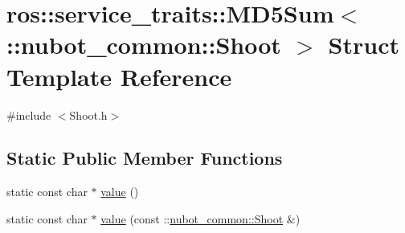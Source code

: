 \hypertarget{structros_1_1service__traits_1_1MD5Sum_3_01_1_1nubot__common_1_1Shoot_01_4}{\section{ros\-:\-:service\-\_\-traits\-:\-:M\-D5\-Sum$<$ \-:\-:nubot\-\_\-common\-:\-:Shoot $>$ Struct Template Reference}
\label{structros_1_1service__traits_1_1MD5Sum_3_01_1_1nubot__common_1_1Shoot_01_4}
}


{\ttfamily \#include $<$Shoot.\-h$>$}

\subsection*{Static Public Member Functions}
\begin{DoxyCompactItemize}
\item 
static const char $\ast$ \hyperlink{structros_1_1service__traits_1_1MD5Sum_3_01_1_1nubot__common_1_1Shoot_01_4_a87b071fb1c8ac272765e8e76f9709746}{value} ()
\item 
static const char $\ast$ \hyperlink{structros_1_1service__traits_1_1MD5Sum_3_01_1_1nubot__common_1_1Shoot_01_4_aa5ddbb138e5bd19636974db6a98a932a}{value} (const \-::\hyperlink{structnubot__common_1_1Shoot}{nubot\-\_\-common\-::\-Shoot} \&)
\end{DoxyCompactItemize}


